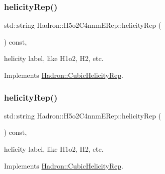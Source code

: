 \mbox{\label{structHadron_1_1H5o2C4nnmERep_acfb835153b5bdf1afdc5c7775912e546}} 
\subsubsection{\texorpdfstring{helicityRep()}{helicityRep()}\hspace{0.1cm}{\footnotesize\ttfamily [1/3]}}
{\footnotesize\ttfamily std\+::string Hadron\+::\+H5o2\+C4nnm\+E\+Rep\+::helicity\+Rep (\begin{DoxyParamCaption}{ }\end{DoxyParamCaption}) const\hspace{0.3cm}{\ttfamily [inline]}, {\ttfamily [virtual]}}

helicity label, like H1o2, H2, etc. 

Implements \mbox{\hyperlink{structHadron_1_1CubicHelicityRep_af1096946b7470edf0a55451cc662f231}{Hadron\+::\+Cubic\+Helicity\+Rep}}.

\mbox{\label{structHadron_1_1H5o2C4nnmERep_acfb835153b5bdf1afdc5c7775912e546}} 
\subsubsection{\texorpdfstring{helicityRep()}{helicityRep()}\hspace{0.1cm}{\footnotesize\ttfamily [2/3]}}
{\footnotesize\ttfamily std\+::string Hadron\+::\+H5o2\+C4nnm\+E\+Rep\+::helicity\+Rep (\begin{DoxyParamCaption}{ }\end{DoxyParamCaption}) const\hspace{0.3cm}{\ttfamily [inline]}, {\ttfamily [virtual]}}

helicity label, like H1o2, H2, etc. 

Implements \mbox{\hyperlink{structHadron_1_1CubicHelicityRep_af1096946b7470edf0a55451cc662f231}{Hadron\+::\+Cubic\+Helicity\+Rep}}.

\mbox{\label{structHadron_1_1H5o2C4nnmERep_acfb835153b5bdf1afdc5c7775912e546}} 
